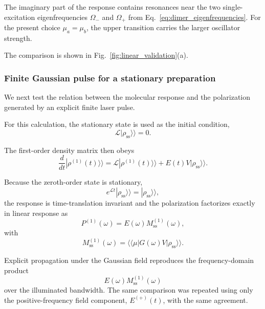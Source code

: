 \documentclass[11pt]{article}
\begin{document}
The imaginary part of the response contains resonances near the two
single-excitation eigenfrequencies
$\Omega_-$ and $\Omega_+$ from
Eq.~\eqref{eq:dimer_eigenfrequencies}.  For the present choice
$\mu_a=\mu_b$, the upper transition carries the larger oscillator
strength.

The comparison is shown in
Fig.~\ref{fig:linear_validation}(a).


\subsubsection{Finite Gaussian pulse for a stationary preparation}

We next test the relation between the molecular response and the
polarization generated by an explicit finite laser pulse.

For this calculation, the stationary state is used as the initial
condition,
%
\begin{equation}
\mathcal{L}
|\rho_{\mathrm{ss}}\rangle\rangle
=
0.
\end{equation}

The first-order density matrix then obeys
%
\begin{equation}
\boxed{
\frac{d}{dt}
|\rho^{(1)}(t)\rangle\rangle
=
\mathcal{L}
|\rho^{(1)}(t)\rangle\rangle
+
E(t)
V
|\rho_{\mathrm{ss}}\rangle\rangle .
}
\label{eq:linear_driven_stationary}
\end{equation}

Because the zeroth-order state is stationary,
%
\begin{equation}
e^{\mathcal{L}t}
|\rho_{\mathrm{ss}}\rangle\rangle
=
|\rho_{\mathrm{ss}}\rangle\rangle,
\end{equation}
%
the response is time-translation invariant and the polarization
factorizes exactly in linear response as
%
\begin{equation}
\boxed{
P^{(1)}(\omega)
=
E(\omega)
M_{\mathrm{ss}}^{(1)}(\omega),
}
\label{eq:linear_polarization_factorization}
\end{equation}
%
with
%
\begin{equation}
M_{\mathrm{ss}}^{(1)}(\omega)
=
\langle\!\langle\mu|
G(\omega)
V
|\rho_{\mathrm{ss}}\rangle\rangle .
\end{equation}

Explicit propagation under the Gaussian field reproduces the
frequency-domain product
%
\begin{equation}
E(\omega)
M_{\mathrm{ss}}^{(1)}(\omega)
\end{equation}
%
over the illuminated bandwidth.  The same comparison was repeated
using only the positive-frequency field component,
$E^{(+)}(t)$, with the same agreement.
\end{document}
